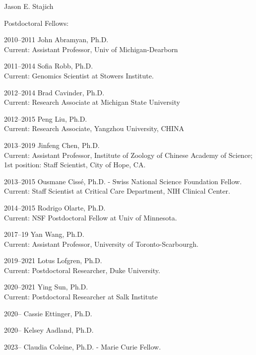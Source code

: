 \documentclass[10pt]{article}
\begin{document}
\begin{cv}{\centerline{Jason E. Stajich}}
\begin{cvlistcompact}{Postdoctoral Fellows:}
\item [2010--2011] John Abramyan, Ph.D. \\
  Current: Assistant Professor, Univ of Michigan-Dearborn
\item [2011--2014] Sofia Robb, Ph.D. \\
  Current: Genomics Scientist at Stowers Institute.
\item [2012--2014] Brad Cavinder, Ph.D. \\
  Current: Research Associate at Michigan State University
\item [2012--2015] Peng Liu, Ph.D. \\
  Current: Research Associate, Yangzhou University, CHINA
\item [2013--2019] Jinfeng Chen, Ph.D. \\
Current: Assistant Professor, Institute of Zoology of Chinese Academy of Science; 1st position: Staff Scientist, City of Hope, CA.
\item [2013--2015] Ousmane Ciss\'{e}, Ph.D. - Swiss National Science Foundation Fellow. \\
  Current: Staff Scientist at Critical Care Department, NIH Clinical Center.
\item [2014--2015] Rodrigo Olarte, Ph.D. \\
  Current: NSF Postdoctoral Fellow at Univ of Minnesota.
\item [2017--19] Yan Wang, Ph.D. \\
  Current: Assistant Professor, University of Toronto-Scarbourgh.
\item [2019--2021] Lotus Lofgren, Ph.D. \\
  Current: Postdoctoral Researcher, Duke University.
\item [2020--2021] Ying Sun, Ph.D. \\
Current: Postdoctoral Researcher at Salk Institute
\item [2020--] Cassie Ettinger, Ph.D.
\item [2020--] Kelsey Aadland, Ph.D.
\item [2023--] Claudia Coleine, Ph.D. - Marie Curie Fellow.
\end{cvlistcompact}


\end{cv}
\end{document}
